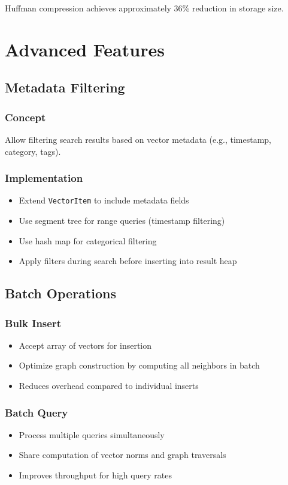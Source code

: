 \documentclass[12pt,a4paper]{article}
\begin{document}
Huffman compression achieves approximately 36\% reduction in storage size.

\section{Advanced Features}

\subsection{Metadata Filtering}

\subsubsection{Concept}
Allow filtering search results based on vector metadata (e.g., timestamp, category, tags).

\subsubsection{Implementation}
\begin{itemize}
    \item Extend \texttt{VectorItem} to include metadata fields
    \item Use segment tree for range queries (timestamp filtering)
    \item Use hash map for categorical filtering
    \item Apply filters during search before inserting into result heap
\end{itemize}

\subsection{Batch Operations}

\subsubsection{Bulk Insert}
\begin{itemize}
    \item Accept array of vectors for insertion
    \item Optimize graph construction by computing all neighbors in batch
    \item Reduces overhead compared to individual inserts
\end{itemize}

\subsubsection{Batch Query}
\begin{itemize}
    \item Process multiple queries simultaneously
    \item Share computation of vector norms and graph traversals
    \item Improves throughput for high query rates
\end{itemize}
\end{document}
